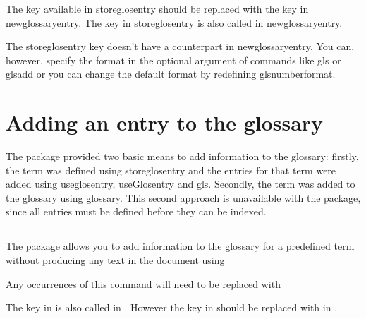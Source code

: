 \documentclass[titlepage=false,oneside,
 fontsize=12pt,captions=tableheading]{scrarticle}
\newenvironment{oldway}
{\begin{codebox*}[title={\styfmt{glossary.sty}}]}
{\end{codebox*}}
\newenvironment{newway}
{\begin{codebox*}[title={\styfmt{glossaries.sty}}]}
{\end{codebox*}}
\begin{document}
The  key available in \gls{storeglosentry}
should be replaced with the  key in
\gls{newglossaryentry}. The  key in \gls{storeglosentry}
is also called  in \gls{newglossaryentry}.

The \gls{storeglosentry}  key doesn't have a
counterpart in \gls{newglossaryentry}. You can, however, specify the
format in the optional argument of commands like \gls{gls} or
\gls{glsadd} or you can change the default format by redefining
\gls{glsnumberformat}.

\section{Adding an entry to the glossary}

The  package provided two basic means to add
information to the glossary: firstly, the term was defined
using \gls{storeglosentry} and the entries for that term were
added using \gls{useglosentry}, \gls{useGlosentry} and \gls{gls}.
Secondly, the term was added to the glossary using \gls{glossary}.
This second approach is unavailable with the 
package, since all entries must be defined before they can be
indexed.

\subsection{}
\label{sec:useglosentry}

The  package allows you to add information to the
glossary for a predefined term without producing any text in the
document using
\begin{oldway}
\end{oldway}%
Any occurrences of this command will need to be replaced with
\begin{newway}
\end{newway}%
The  key in  is also called
 in . However the
 key in
 should be replaced with
 in .

\subsection{}
\end{document}
